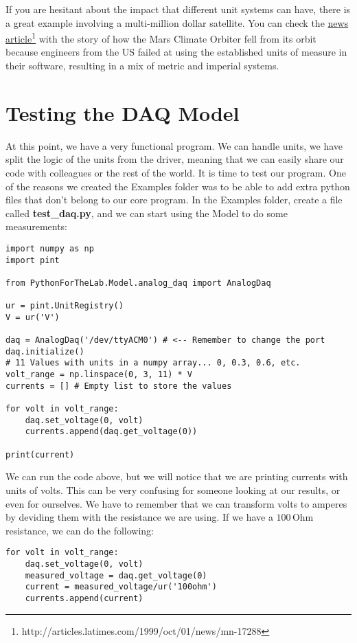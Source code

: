 If you are hesitant about the impact that different unit systems can have, there is a great example involving a multi-million dollar satellite. You can check the \href{http://articles.latimes.com/1999/oct/01/news/mn-17288}{news article}\footnote{http://articles.latimes.com/1999/oct/01/news/mn-17288} with the story of how the Mars Climate Orbiter fell from its orbit because engineers from the US failed at using the established units of measure in their software, resulting in a mix of metric and imperial systems.

\section{Testing the DAQ Model}\label{sec:testing-the-daq-model}
At this point, we have a very functional program. We can handle units, we have split the logic of the units from the driver, meaning that we can easily share our code with colleagues or the rest of the world. It is time to test our program. One of the reasons we created the Examples folder was to be able to add extra python files that don't belong to our core program. In the Examples folder, create a file called \textbf{test\_daq.py}, and we can start using the Model to do some measurements:

\begin{verbatim}
import numpy as np
import pint

from PythonForTheLab.Model.analog_daq import AnalogDaq

ur = pint.UnitRegistry()
V = ur('V')

daq = AnalogDaq('/dev/ttyACM0') # <-- Remember to change the port
daq.initialize()
# 11 Values with units in a numpy array... 0, 0.3, 0.6, etc.
volt_range = np.linspace(0, 3, 11) * V
currents = [] # Empty list to store the values

for volt in volt_range:
    daq.set_voltage(0, volt)
    currents.append(daq.get_voltage(0))

print(current)
\end{verbatim}

We can run the code above, but we will notice that we are printing currents with units of volts. This can be very confusing for someone looking at our results, or even for ourselves. We have to remember that we can transform volts to amperes by deviding them with the resistance we are using. If we have a $100\,\textrm{Ohm}$ resistance, we can do the following:

\begin{verbatim}
for volt in volt_range:
    daq.set_voltage(0, volt)
    measured_voltage = daq.get_voltage(0)
    current = measured_voltage/ur('100ohm')
    currents.append(current)
\end{verbatim}

